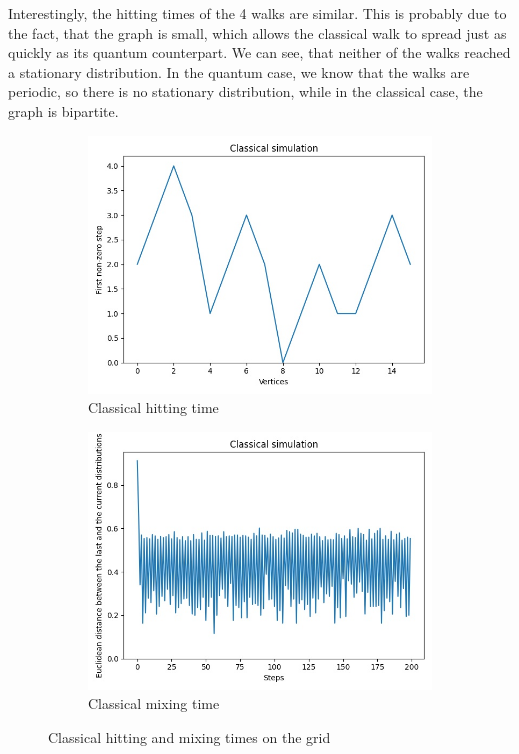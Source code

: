 Interestingly, the hitting times of the 4 walks are similar. This is probably due to the fact, that the
graph is small, which allows the classical walk to spread just as quickly as its quantum counterpart. We can see, that neither of the walks reached a stationary distribution. In the quantum case, we know that the walks
are periodic, so there is no stationary distribution, while in the classical case, the graph is bipartite.

\begin{figure}[H]
  \centering
  \begin{subfigure}{.45\linewidth}
    \centering
    \includegraphics[width=\linewidth]{./figures/results/grid/classical_hitting_time.jpg}
    \caption{Classical hitting time}
  \end{subfigure}
  \begin{subfigure}{.45\linewidth}
    \centering
    \includegraphics[width=\linewidth]{./figures/results/grid/classical_mixing_time.jpg}
    \caption{Classical mixing time}
  \end{subfigure}
  \caption{Classical hitting and mixing times on the grid}
\end{figure}

